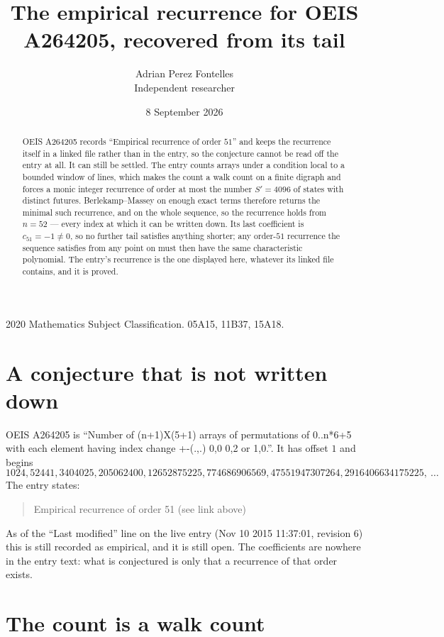 \documentclass[11pt,a4paper]{article}
\title{The empirical recurrence for OEIS A264205, recovered from its tail}
\author{Adrian Perez Fontelles\\ \small Independent researcher}
\date{8 September 2026}
\theoremstyle{plain}
\theoremstyle{definition}
\begin{document}
\maketitle

\begin{abstract}
OEIS A264205 records ``Empirical recurrence of order $51$'' and keeps the recurrence itself in
a linked file rather than in the entry, so the conjecture cannot be read off the entry at all.
It can still be settled. The entry counts arrays under a condition local to a bounded window of
lines, which makes the count a walk count on a finite digraph and forces a monic integer
recurrence of order at most the number $S'=4096$ of states with distinct futures. Berlekamp--Massey on
enough exact terms therefore returns the minimal such recurrence, and on the whole sequence, so the recurrence holds from $n=52$ --- every index at which it can be written down.
Its last coefficient is $c_{51}=-1\neq0$, so no further tail satisfies anything
shorter; any order-$51$ recurrence the sequence satisfies from any point on must then have
the same characteristic polynomial. The entry's recurrence is the one displayed here, whatever
its linked file contains, and it is proved.
\end{abstract}

\noindent\small 2020 Mathematics Subject Classification. 05A15, 11B37, 15A18.\normalsize

\section{A conjecture that is not written down}

OEIS A264205 is ``Number of (n+1)X(5+1) arrays of permutations of 0..n*6+5 with each element having index change +-(.,.) 0,0 0,2 or 1,0.''. It has offset $1$ and begins
\[
1024, 52441, 3404025, 205062400, 12652875225, 774686906569, 47551947307264, 2916406634175225,\ \dots
\]
The entry states:
\begin{quote}
Empirical recurrence of order 51 (see link above)
\end{quote}
As of the ``Last modified'' line on the live entry (Nov 10 2015 11:37:01, revision 6)
this is still recorded as empirical, and it is still open. The coefficients are nowhere in the
entry text: what is conjectured is only that a recurrence of that order exists.

\section{The count is a walk count}
\end{document}
